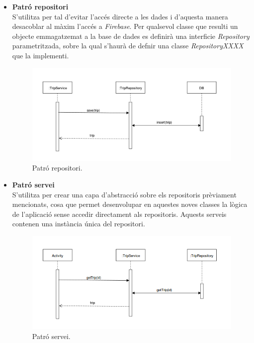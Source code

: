 \begin{itemize}
\clearpage

\item{\textbf{Patró repositori}}\\
S'utilitza per tal d'evitar l'accés directe a les dades i d'aquesta manera desacoblar al màxim l'accés a \textit{Firebase}. Per qualsevol classe que resulti un objecte emmagatzemat a la base de dades es definirà una interficie \textit{Repository} parametritzada, sobre la qual s'haurà de defnir una classe \textit{RepositoryXXXX} que la implementi.

\begin{figure}[!h]
\centering
\includegraphics[scale=0.75]{Figures/patroRepositori.png}
\caption{Patró repositori.}
\end{figure}

\item{\textbf{Patró servei}}\\
S'utilitza per crear una capa d'abstracció sobre els repositoris prèviament mencionats, cosa que permet desenvolupar en aquestes noves classes la lògica de l'aplicació sense accedir directament als repositoris. Aquests serveis contenen una instància única del repositori.

\begin{figure}[!h]
\centering
\includegraphics[scale=0.75]{Figures/patroServei.png}
\caption{Patró servei.}
\end{figure}

\end{itemize}

